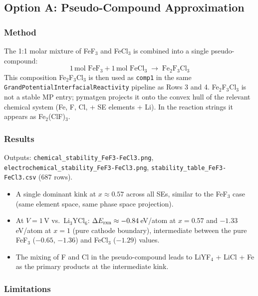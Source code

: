 \documentclass[11pt,letterpaper]{article}
\begin{document}
\subsection{Option A: Pseudo-Compound Approximation}

\subsubsection{Method}

The 1:1 molar mixture of FeF$_3$ and FeCl$_3$ is combined into a
single pseudo-compound:
\begin{equation}
  1\,\text{mol FeF}_3 + 1\,\text{mol FeCl}_3 \;\longrightarrow\; \text{Fe}_2\text{F}_3\text{Cl}_3
\end{equation}
This composition Fe$_2$F$_3$Cl$_3$ is then used as \texttt{comp1} in the
same \texttt{GrandPotentialInterfacialReactivity} pipeline as Rows 3 and 4.
Fe$_2$F$_3$Cl$_3$ is not a stable MP entry; pymatgen projects it onto the
convex hull of the relevant chemical system (Fe, F, Cl, + SE elements + Li).
In the reaction strings it appears as Fe$_2$(ClF)$_3$.

\subsubsection{Results}

Outputs: \texttt{chemical\_stability\_FeF3-FeCl3.png},
\texttt{electrochemical\_stability\_FeF3-FeCl3.png},
\texttt{stability\_table\_FeF3-FeCl3.csv} (687 rows).

\begin{itemize}
  \item A single dominant kink at $x \approx 0.57$ across all SEs,
        similar to the FeF$_3$ case (same element space, same phase
        space projection).
  \item At $V=1$\,V vs.\ Li$_3$YCl$_6$:
        $\Delta E_{\rm rxn} \approx -0.84$\,eV/atom at $x=0.57$
        and $-1.33$\,eV/atom at $x=1$ (pure cathode boundary),
        intermediate between the pure FeF$_3$ ($-0.65$, $-1.36$)
        and FeCl$_3$ ($-1.29$) values.
  \item The mixing of F and Cl in the pseudo-compound leads to
        LiYF$_4$ + LiCl + Fe as the primary products at the
        intermediate kink.
\end{itemize}

\subsubsection{Limitations}
\end{document}
